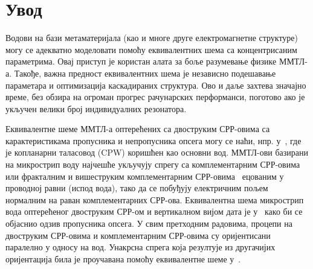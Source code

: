 \section{Увод}

Водови на бази метаматеријала (као и многе друге електромагнетне структуре) могу се адекватно моделовати помоћу еквивалентних шема са концентрисаним параметрима. Овај приступ је користан алата за боље разумевање физике ММТЛ-а. Такође, важна предност еквивалентних шема је независно подешавање параметара и оптимизација каскадираних структура. Ово и даље захтева значајно време, без обзира на огроман прогрес рачунарских перформанси, поготово ако је укључен велики број индивидуалних резонатора.

Еквивалентне шеме ММТЛ-а оптерећених са двоструким СРР-овима са карактеристикама пропусника и непропусника опсега могу се наћи, нпр. у~\cite{baena,aznar_improved}, где је копланарни таласовод (CPW) коришћен као основни вод. ММТЛ-ови базирани на микрострип воду најчешће укључују спрегу са комплементарним СРР-овима~\cite{bib14} или фракталним и вишеструким комплементарним СРР-овима~\cite{bib15} ецованим у проводној равни (испод вода), тако да се побуђују електричним пољем нормалним на раван комплементарних СРР-ова. Еквивалентна шема микрострип вода оптерећеног двоструким СРР-ом и вертикалном вијом дата је у~\cite{bib16} како би се објаснио одзив пропусника опсега. У свим претходним радовима, процепи на двоструким СРР-овима и комплементарним СРР-овима су оријентисани паралелно у односу на вод. Унакрсна спрега која резултује из другачијих оријентација била је проучавана помоћу еквивалентне шеме у~\cite{naqui:13}.

